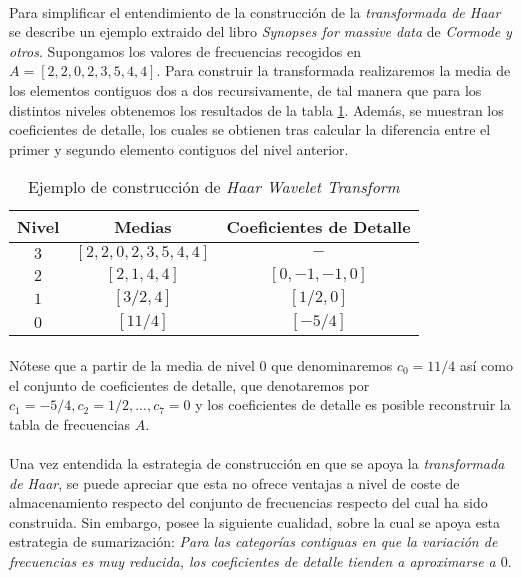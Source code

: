 \documentclass{subfiles}
\begin{document}
          \paragraph{}
          Para simplificar el entendimiento de la construcción de la \emph{transformada de Haar} se describe un ejemplo extraido del libro \emph{Synopses for massive data} \cite{cormode2012synopses} de \emph{Cormode y otros}. Supongamos los valores de frecuencias recogidos en $A = [2,2,0,2,3,5,4,4]$. Para construir la transformada realizaremos la media de los elementos contiguos dos a dos recursivamente, de tal manera que para los distintos niveles obtenemos los resultados de la tabla \ref{table:wavelet_example}. Además, se muestran los coeficientes de detalle, los cuales se obtienen tras calcular la diferencia entre el primer y segundo elemento contiguos del nivel anterior.

          \begin{table}[H]
            \centering
            \begin{tabular}{| c | c | c |}
              \hline
              Nivel & Medias & Coeficientes de Detalle  \\ \hline \hline
              $3$ & $[2,2,0,2,3,5,4,4]$ & $-$         \\ \hline
              $2$ & $[2,1,4,4]$         & $[0,-1,-1,0]$ \\ \hline
              $1$ & $[3/2,4]$           & $[1/2, 0]$    \\ \hline
              $0$ & $[11/4]$            & $[-5/4]$      \\
              \hline
            \end{tabular}
            \caption{Ejemplo de construcción de \emph{Haar Wavelet Transform}}
            \label{table:wavelet_example}
          \end{table}

          \paragraph{}
          Nótese que a partir de la media de nivel 0 que denominaremos $c_0 = 11/4$ así como el conjunto de coeficientes de detalle, que denotaremos por $c_1 = -5/4, c_2 = 1/2, ..., c_7 = 0$ y los coeficientes de detalle es posible reconstruir la tabla de frecuencias $A$.

        \paragraph{}
        Una vez entendida la estrategia de construcción en que se apoya la \emph{transformada de Haar}, se puede apreciar que esta no ofrece ventajas a nivel de coste de almacenamiento respecto del conjunto de frecuencias respecto del cual ha sido construida. Sin embargo, posee la siguiente cualidad, sobre la cual se apoya esta estrategia de sumarización: \emph{Para las categorías contiguas en que la variación de frecuencias es muy reducida, los coeficientes de detalle tienden a aproximarse a $0$}.
\end{document}
